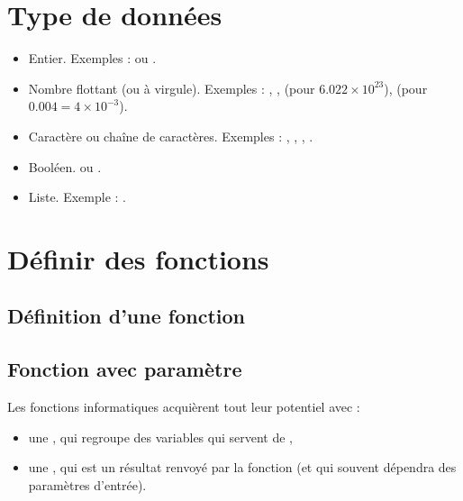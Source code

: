 \documentclass[11pt,class=report,crop=false]{standalone}
\begin{document}
\section{Type de données}


\begin{itemize}
  \item {}  \quad Entier. Exemples :  ou .
  \item {} \quad Nombre flottant (ou à virgule). Exemples : ,
,  (pour $6.022 \times 10^{23}$),  (pour $0.004 = 4 \times 10^{-3}$).
  \item {} \quad Caractère ou chaîne de caractères. Exemples : ,
  , , . 
  \item {} \quad Booléen.  ou .
  \item {} \quad Liste. Exemple : \ci{[1,2,3,4]}.
\end{itemize}



\section{Définir des fonctions}

\subsection{Définition d'une fonction}


\subsection{Fonction avec paramètre}

Les fonctions informatiques acquièrent tout leur potentiel avec :
\begin{itemize}
  \item une , qui regroupe des variables qui servent de ,
  \item une , qui est un résultat renvoyé par la fonction (et qui souvent dépendra des paramètres d'entrée).
\end{itemize}
\end{document}
